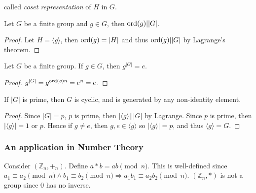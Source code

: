 \documentclass[a4paper]{article}
\begin{document}
called \textit{coset representation} of $H$ in $G$.
\begin{corollary}\label{col:3.5}
  Let $G$ be a finite group and $g\in G$, then $ \operatorname{ord}(g)||G| $.
\end{corollary}
\begin{proof}
  Let $ H=\langle g \rangle $, then $ \operatorname{ord}(g)=|H| $ and thus $
  \operatorname{ord}(g)||G| $ by Lagrange's theorem.
\end{proof}
\begin{corollary}\label{col:3.6}
  Let $G$ be a finite group. If $g\in G$, then $ g^{|G|}=e $.
\end{corollary}
\begin{proof}
  $ g^{|G|}=g^{\operatorname{ord}(g)n}=e^{n}=e $.
\end{proof}
\begin{corollary}\label{col:3.7}
  If $ |G| $ is prime, then $G$ is cyclic, and is generated by any
  non-identity element.
\end{corollary}
\begin{proof}
  Since $ |G|=p $, $p$ is prime, then $ |\langle g \rangle |||G| $ by
  Lagrange. Since $p$ is prime, then $ |\langle g \rangle |=1 $ or
  $p$. Hence if $g\neq e$, then $ g,e\in \langle g \rangle  $ so $
  |\langle g \rangle |=p $, and thus $ \langle g \rangle =G $.
\end{proof}
\subsubsection{An application in Number Theory}
Consider $ (\mathbb{Z}_n, +_n) $. Define $ a*b=ab\pmod n $. This is
well-defined since $ a_1 \equiv a_2\pmod n \land b_1 \equiv b_2 \pmod
n \Rightarrow a_1b_1 \equiv a_2b_2\pmod n $. $ (\mathbb{Z}_n, *) $ is
not a group since $0$ has no inverse.
\end{document}
